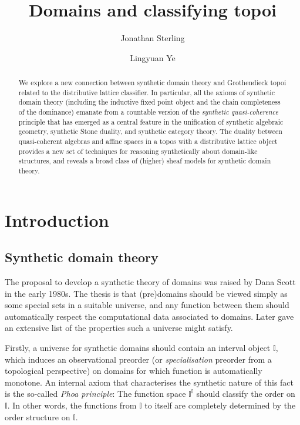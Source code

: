 \documentclass[a4paper,12pt]{amsart}
\title{Domains and classifying topoi}
\author{Jonathan Sterling}
\author{Lingyuan Ye}
\theoremstyle{definition}
\newcommand{\mbb}[1]{\mathbb{#1}}
\newcommand{\I}{\mbb I}
\begin{document}
\begin{abstract}
  We explore a new connection between synthetic domain theory and Grothendieck topoi related to the distributive lattice classifier. In particular, all the axioms of synthetic domain theory (including the inductive fixed point object and the chain completeness of the dominance) emanate from a countable version of the \emph{synthetic quasi-coherence} principle that has emerged as a central feature in the unification of synthetic algebraic geometry, synthetic Stone duality, and synthetic category theory. The duality between quasi-coherent algebras and affine spaces in a topos with a distributive lattice object provides a new set of techniques for reasoning synthetically about domain-like structures, and reveals a broad class of (higher) sheaf models for synthetic domain theory.
\end{abstract}

\maketitle
\tableofcontents


\section{Introduction}\label{sec:intro}

\subsection{Synthetic domain theory}\label{subsec:sdt}

The proposal to develop a synthetic theory of domains was raised by Dana Scott in the early 1980s. The thesis is that (pre)domains should be viewed simply as some special sets in a suitable universe, and any function between them should automatically respect the computational data associated to domains. Later \citet{hyland1990first} gave an extensive list of the properties such a universe might satisfy.

Firstly, a universe for synthetic domains should contain an interval object $\I$, which induces an observational preorder (or \emph{specialisation} preorder from a topological perspective) on domains for which function is automatically monotone. An internal axiom that characterises the synthetic nature of this fact is the so-called \emph{Phoa principle}: The function space $\I^\I$ should classify the order on $\I$. In other words, the functions from $\I$ to itself are completely determined by the order structure on $\I$. 
\end{document}
